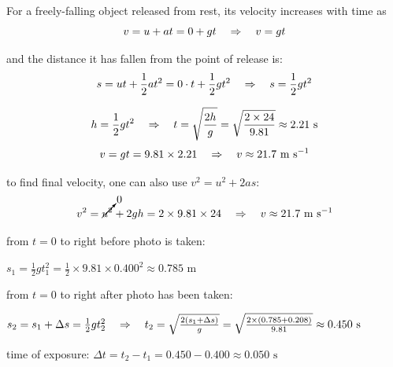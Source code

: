 For a freely-falling object released from rest, its velocity increases with time as
\begin{equation*}
	v=u+at = 0 + gt \quad \Rightarrow \quad v = gt
\end{equation*}

and the distance it has fallen from the point of release is:
\begin{equation*}
s=ut+\frac{1}{2} at^2 = 0\cdot t + \frac{1}{2}gt^2 \quad \Rightarrow \quad s=\frac{1}{2}gt^2
\end{equation*}

\begin{soln}
\begin{equation*}
h = \frac{1}{2}gt^2 \quad \Rightarrow \quad t = \sqrt{\frac{2h}{g}} = \sqrt{\frac{2\times24}{9.81}} \approx 2.21 \text{ s}
\end{equation*}
\begin{equation*}
v = gt = 9.81 \times 2.21 \quad \Rightarrow \quad v \approx 21.7 \text{ m s$^{-1}$}
\end{equation*}

to find final velocity, one can also use $v^2 = u^2 + 2as$:
\begin{equation*}
v^2 = \cancelto{0}{u^2} + 2gh = 2\times9.81\times24 \quad \Rightarrow \quad v \approx 21.7 \text{ m s$^{-1}$} 
\end{equation*}
\end{soln}


\begin{soln} from $t=0$ to right before photo is taken: 
{	\centering
	
	$s_1 = \frac{1}{2}gt_1^2 = \frac{1}{2}\times9.81\times0.400^2 \approx 0.785 \text{ m}$
	
}

from $t=0$ to right after photo has been taken: 

{
	\centering
	
	$s_2 = s_1 + \Delta s = \frac{1}{2}gt^2_2 \quad \Rightarrow \quad t_2 = \sqrt{\frac{2(s_1+\Delta s)}{g}} = \sqrt{\frac{2\times(0.785+0.208)}{9.81}} \approx 0.450 \text{ s}$
	
}

time of exposure: $\Delta t = t_2 - t_1 = 0.450 - 0.400 \approx 0.050 \text{ s}$ 
\end{soln}



